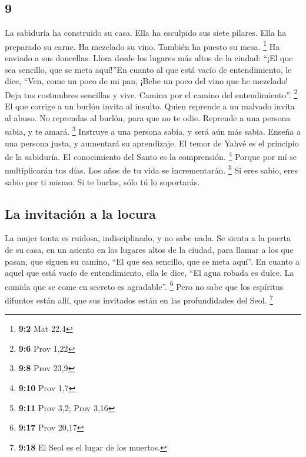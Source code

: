 \begin{paracol}{2}
\hypertarget{section-16}{%
\section{9}\label{section-16}}

 La sabiduría ha construido su casa. Ella ha esculpido sus
siete pilares.  Ella ha preparado su carne. Ha mezclado su
vino. También ha puesto su mesa. \footnote{\textbf{9:2} Mat 22,4}
 Ha enviado a sus doncellas. Llora desde los lugares más
altos de la ciudad:  ``¡El que sea sencillo, que se meta
aquí!''En cuanto al que está vacío de entendimiento, le dice,
 ``Ven, come un poco de mi pan, ¡Bebe un poco del vino que
he mezclado!  Deja tus costumbres sencillas y vive. Camina
por el camino del entendimiento''. \footnote{\textbf{9:6} Prov 1,22}
 El que corrige a un burlón invita al insulto. Quien
reprende a un malvado invita al abuso.  No reprendas al
burlón, para que no te odie. Reprende a una persona sabia, y te amará.
\footnote{\textbf{9:8} Prov 23,9}  Instruye a una persona
sabia, y será aún más sabia. Enseña a una persona justa, y aumentará su
aprendizaje.  El temor de Yahvé es el principio de la
sabiduría. El conocimiento del Santo es la comprensión. \footnote{\textbf{9:10}
  Prov 1,7}  Porque por mí se multiplicarán tus días. Los
años de tu vida se incrementarán. \footnote{\textbf{9:11} Prov 3,2; Prov
  3,16}  Si eres sabio, eres sabio por ti mismo. Si te
burlas, sólo tú lo soportarás.

\hypertarget{la-invitaciuxf3n-a-la-locura}{%
\subsection{La invitación a la
locura}\label{la-invitaciuxf3n-a-la-locura}}

 La mujer tonta es ruidosa, indisciplinado, y no sabe
nada.  Se sienta a la puerta de su casa, en un asiento en
los lugares altos de la ciudad,  para llamar a los que
pasan, que siguen su camino,  ``El que sea sencillo, que
se meta aquí''. En cuanto a aquel que está vacío de entendimiento, ella
le dice,  ``El agua robada es dulce. La comida que se
come en secreto es agradable''. \footnote{\textbf{9:17} Prov 20,17}
 Pero no sabe que los espíritus difuntos están allí, que
sus invitados están en las profundidades del Seol. \footnote{\textbf{9:18}
  El Seol es el lugar de los muertos.}


\end{paracol}
